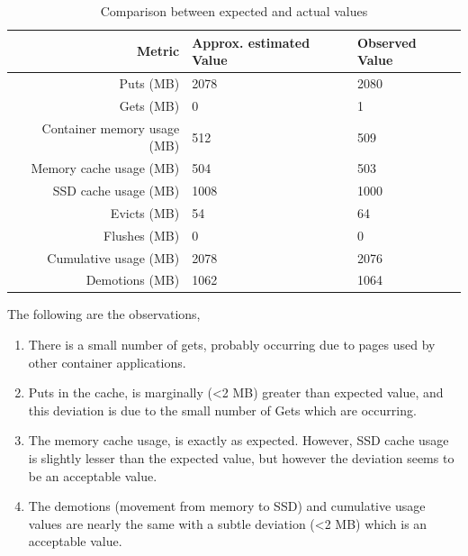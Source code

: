 	    \vspace*{1em}	
	      \begin{table}
		\begin{center}
		  \begin{tabular}{ r | p{4cm} | p{4cm} }	      	    
			Metric & Approx. estimated Value & Observed Value \\ 
		    \hline
		    \hline
		    Puts (MB) & 2078 & 2080 \\
		    \hline
		    Gets (MB) & 0 & 1 \\
		    \hline
		    Container memory usage (MB) & 512 & 509 \\  
		    \hline
		    Memory cache usage (MB) & 504 & 503 \\
		    \hline 
		    SSD cache usage (MB) & 1008 & 1000 \\
		    \hline
		    Evicts (MB) & 54  & 64 \\
		    \hline
		    Flushes (MB) & 0  & 0 \\
		    \hline
		    Cumulative usage (MB) & 2078 & 2076 \\
		    \hline
		    Demotions (MB) & 1062 & 1064 \\
		    \hline
		    
		  \end{tabular}
		\caption{Comparison between expected and actual values}
		\label{table:correctness_memtossd}
		\end{center}	  
	      \end{table}
	    \vspace*{1em}
	    
	  The following are the observations,	  
	    \begin{enumerate}
	     \item There is a small number of gets, probably occurring due to pages used by other container applications.
	     \item Puts in the cache, is marginally (\textless2 MB) greater than expected value, and this deviation is due to the small number 
	     of Gets which are occurring.
	     \item The memory cache usage, is exactly as expected. However, SSD cache usage is slightly lesser than the expected value, 
	     but however the deviation seems to be an acceptable value.
	     \item The demotions (movement from memory to SSD) and cumulative usage values are nearly the same with a subtle deviation 
	     (\textless2 MB) which is an acceptable value.
	    \end{enumerate}

